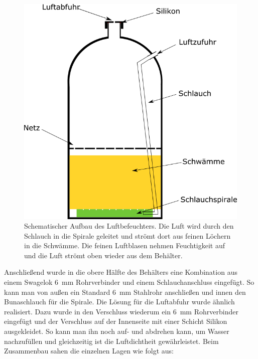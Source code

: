 \begin{figure}[h!]
	\begin{center}
		\includegraphics[scale=0.47]{Luftbefeuchter.png}
		\caption[Schema Luftbefeuchter]{Schematischer Aufbau des Luftbefeuchters. Die Luft wird durch den Schlauch in die Spirale geleitet und strömt dort aus feinen Löchern in die Schwämme. Die feinen Luftblasen nehmen Feuchtigkeit auf und die Luft strömt oben wieder aus dem Behälter.}
	\end{center}
\end{figure}


Anschließend wurde in die obere Hälfte des Behälters eine Kombination aus einem Swagelok \SI{6}{mm} Rohrverbinder und einem Schlauchanschluss eingefügt. So kann man von außen ein Standard \SI{6}{mm} Stahlrohr anschließen und innen den Bunaschlauch für die Spirale. Die Lösung für die Luftabfuhr wurde ähnlich realisiert. Dazu wurde in den Verschluss wiederum ein \SI{6}{mm} Rohrverbinder eingefügt und der Verschluss auf der Innenseite mit einer Schicht Silikon ausgekleidet. So kann man ihn noch auf- und abdrehen kann, um Wasser nachzufüllen und gleichzeitig ist die Luftdichtheit gewährleistet.
Beim Zusammenbau sahen die einzelnen Lagen wie folgt aus:


